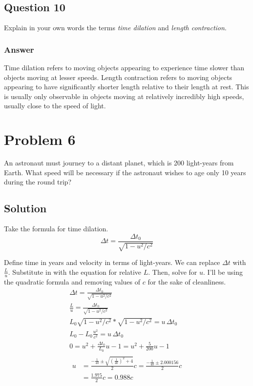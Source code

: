\documentclass[12pt]{article}
\begin{document}
    \subsection{Question 10}
        Explain in your own words the terms \textit{time dilation} and \textit{length contraction}.

        \subsubsection{Answer}
            Time dilation refers to moving objects appearing to experience time slower than objects moving at lesser speeds.
            Length contraction refers to moving objects appearing to have significantly shorter length relative to their length at rest. 
            This is usually only observable in objects moving at relatively incredibly high speeds, usually close to the speed of light.
    \pagebreak

\section{Problem 6} %
    An astronaut must journey to a distant planet, which is 200 light-years from Earth. 
    What speed will be necessary if the astronaut wishes to age only 10 years during the round trip?

    \subsection{Solution}
        Take the formula for time dilation.
        \begin{equation}
            \Delta t    =   \frac{\Delta t_0}{\sqrt{1 - u^2/c^2}}
        \end{equation}

        Define time in years and velocity in terms of light-years.
        We can replace $\Delta t$ with $\frac{L}{u}$.
        Substitute in with the equation for relative $L$.
        Then, solve for $u$.
        I'll be using the quadratic formula and removing values of $c$ for the sake of cleanliness.
        \begin{gather}
            \Delta t    =   \frac{\Delta t_0}{\sqrt{1 - u^2/c^2}}\\
            \frac{L}{u}    =   \frac{\Delta t_0}{\sqrt{1 - u^2/c^2}}\\
            L_0 \sqrt{1 - u^2/c^2} * \sqrt{1 - u^2/c^2} = u\,\Delta t_0\\
            L_0 - L_0 \frac{u^2}{c^2} = u\,\Delta t_0\\
            0   =   u^2 + \frac{\Delta t_0}{L_0} u - 1
                =   u^2 + \frac{5}{200} u - 1\\
            \begin{align}
                u   &=  \frac{-\frac{1}{40} \pm \sqrt{\left( \frac{1}{40} \right)^2 + 4}}{2}c
                    =   \frac{-\frac{1}{40} \pm 2.000156}{2}c\\
                    &=  \frac{1.975}{2}c
                    =   \boxed{0.988c}
            \end{align}
        \end{gather}
    \pagebreak
\end{document}
